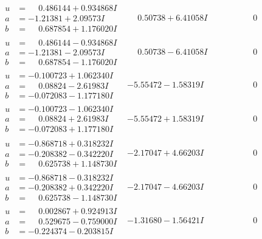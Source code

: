 \documentclass[1p]{elsarticle_modified}
\theoremstyle{definition}
\begin{document}
$$\begin{array}{c|c|c}
\begin{aligned}
u &= \phantom{-}0.486144 + 0.934868 I \\
a &= -1.21381 + 2.09573 I \\
b &= \phantom{-}0.687854 + 1.176020 I\end{aligned}
 & \phantom{-}0.50738 + 6.41058 I & \phantom{-0.000000 } 0 \\ \hline\begin{aligned}
u &= \phantom{-}0.486144 - 0.934868 I \\
a &= -1.21381 - 2.09573 I \\
b &= \phantom{-}0.687854 - 1.176020 I\end{aligned}
 & \phantom{-}0.50738 - 6.41058 I & \phantom{-0.000000 } 0 \\ \hline\begin{aligned}
u &= -0.100723 + 1.062340 I \\
a &= \phantom{-}0.08824 - 2.61983 I \\
b &= -0.072083 - 1.177180 I\end{aligned}
 & -5.55472 - 1.58319 I & \phantom{-0.000000 } 0 \\ \hline\begin{aligned}
u &= -0.100723 - 1.062340 I \\
a &= \phantom{-}0.08824 + 2.61983 I \\
b &= -0.072083 + 1.177180 I\end{aligned}
 & -5.55472 + 1.58319 I & \phantom{-0.000000 } 0 \\ \hline\begin{aligned}
u &= -0.868718 + 0.318232 I \\
a &= -0.208382 - 0.342220 I \\
b &= \phantom{-}0.625738 + 1.148730 I\end{aligned}
 & -2.17047 + 4.66203 I & \phantom{-0.000000 } 0 \\ \hline\begin{aligned}
u &= -0.868718 - 0.318232 I \\
a &= -0.208382 + 0.342220 I \\
b &= \phantom{-}0.625738 - 1.148730 I\end{aligned}
 & -2.17047 - 4.66203 I & \phantom{-0.000000 } 0 \\ \hline\begin{aligned}
u &= \phantom{-}0.002867 + 0.924913 I \\
a &= \phantom{-}0.529675 - 0.759000 I \\
b &= -0.224374 - 0.203815 I\end{aligned}
 & -1.31680 - 1.56421 I & \phantom{-0.000000 } 0 \\ \hline\begin{aligned}

\end{aligned}
\end{array}$$
\end{document}
